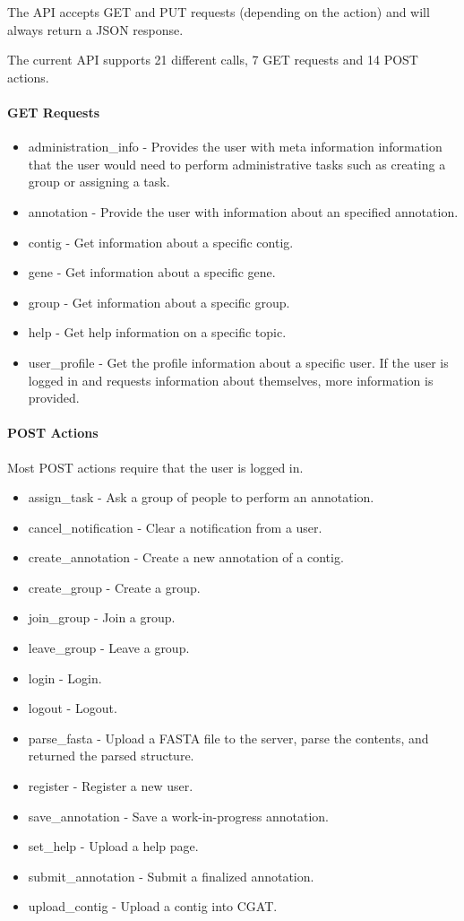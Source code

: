 \documentclass[10pt, conference, compsocconf]{IEEEtran}
\begin{document}
The API accepts GET and PUT requests (depending on the action) and will always return a JSON response.

The current API supports 21 different calls, 7 GET requests and 14 POST actions.

\paragraph{GET Requests}
\begin{itemize}
\item administration\_info - Provides the user with meta information information that the user would need to perform administrative tasks such as creating a group or assigning a task.
\item annotation - Provide the user with information about an specified annotation.
\item contig - Get information about a specific contig.
\item gene - Get information about a specific gene.
\item group - Get information about a specific group.
\item help - Get help information on a specific topic.
\item user\_profile - Get the profile information about a specific user. If the user is logged in and requests information about themselves, more information is provided.
\end{itemize}

\paragraph{POST Actions}
Most POST actions require that the user is logged in.

\begin{itemize}
\item assign\_task - Ask a group of people to perform an annotation.
\item cancel\_notification - Clear a notification from a user.
\item create\_annotation - Create a new annotation of a contig.
\item create\_group - Create a group.
\item join\_group - Join a group.
\item leave\_group - Leave a group.
\item login - Login.
\item logout - Logout.
\item parse\_fasta - Upload a FASTA file to the server, parse the contents, and returned the parsed structure.
\item register - Register a new user.
\item save\_annotation - Save a work-in-progress annotation.
\item set\_help - Upload a help page.
\item submit\_annotation - Submit a finalized annotation.
\item upload\_contig - Upload a contig into CGAT.
\end{itemize}
\end{document}
